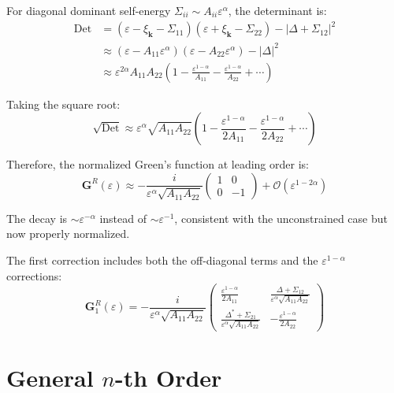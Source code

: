 \documentclass[12pt]{article}
\begin{document}
For diagonal dominant self-energy $\Sigma_{ii} \sim A_{ii}\varepsilon^\alpha$, the determinant is:
\begin{align}
\text{Det} &= (\varepsilon - \xi_{\mathbf{k}} - \Sigma_{11})(\varepsilon + \xi_{\mathbf{k}} - \Sigma_{22}) - |\Delta + \Sigma_{12}|^2 \\
&\approx (\varepsilon - A_{11}\varepsilon^\alpha)(\varepsilon - A_{22}\varepsilon^\alpha) - |\Delta|^2 \\
&\approx \varepsilon^{2\alpha}A_{11}A_{22}\left(1 - \frac{\varepsilon^{1-\alpha}}{A_{11}} - \frac{\varepsilon^{1-\alpha}}{A_{22}} + \cdots\right)
\end{align}

Taking the square root:
\begin{equation}
\sqrt{\text{Det}} \approx \varepsilon^\alpha\sqrt{A_{11}A_{22}}\left(1 - \frac{\varepsilon^{1-\alpha}}{2A_{11}} - \frac{\varepsilon^{1-\alpha}}{2A_{22}} + \cdots\right)
\end{equation}

Therefore, the normalized Green's function at leading order is:
\begin{equation}
\boxed{
\mathbf{G}^R(\varepsilon) \approx -\frac{i}{\varepsilon^\alpha\sqrt{A_{11}A_{22}}}\begin{pmatrix}
1 & 0 \\
0 & -1
\end{pmatrix} + \mathcal{O}(\varepsilon^{1-2\alpha})
}
\end{equation}

The decay is $\sim \varepsilon^{-\alpha}$ instead of $\sim \varepsilon^{-1}$, consistent with the unconstrained case but now properly normalized.

The first correction includes both the off-diagonal terms and the $\varepsilon^{1-\alpha}$ corrections:
\begin{equation}
\mathbf{G}^R_1(\varepsilon) = -\frac{i}{\varepsilon^\alpha\sqrt{A_{11}A_{22}}}\begin{pmatrix}
\frac{\varepsilon^{1-\alpha}}{2A_{11}} & \frac{\Delta + \Sigma_{12}}{\varepsilon^\alpha\sqrt{A_{11}A_{22}}} \\
\frac{\Delta^* + \Sigma_{21}}{\varepsilon^\alpha\sqrt{A_{11}A_{22}}} & -\frac{\varepsilon^{1-\alpha}}{2A_{22}}
\end{pmatrix}
\end{equation}

\section{General $n$-th Order}
\end{document}
